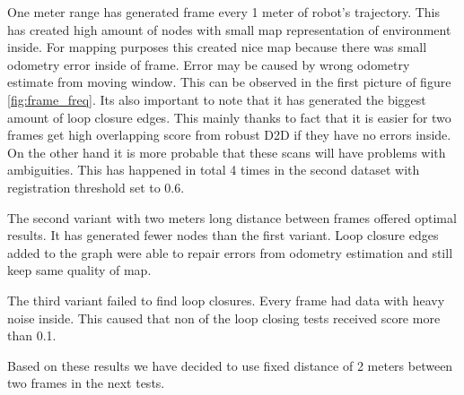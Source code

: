 One meter range has generated frame every 1 meter of robot's trajectory. This has created high amount of nodes with small map representation of environment inside. For mapping purposes this created nice map because there was small odometry error inside of frame. Error may be caused by wrong odometry estimate from moving window. This can be observed in the first picture of figure \ref{fig:frame_freq}. Its also important to note that it has generated the biggest amount of loop closure edges. This mainly thanks to fact that it is easier for two frames get high overlapping score from robust D2D if they have no errors inside. On the other hand it is more probable that these scans will have problems with ambiguities. This has happened in total 4 times in the second dataset with registration threshold set to 0.6.

The second variant with two meters long distance between frames offered optimal results. It has generated fewer nodes than the first variant. Loop closure edges added to the graph were able to repair errors from odometry estimation and still keep same quality of map.

The third variant failed to find loop closures. Every frame had data with heavy noise inside. This caused that non of the loop closing tests received score more than 0.1.

Based on these results we have decided to use fixed distance of 2 meters between two frames in the next tests.


